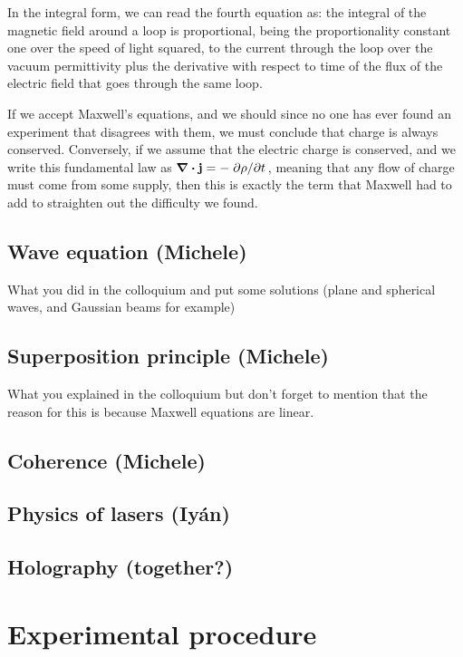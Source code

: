 \documentclass[11pt,a4paper]{article}
\begin{document}
In the integral form, we can read the fourth equation as: the integral of the magnetic field around a loop is proportional, being the proportionality constant one over the speed of light squared, to the current through the loop over the vacuum permittivity plus the derivative with respect to time of the flux of the electric field that goes through the same loop.

If we accept Maxwell's equations, and we should since no one has ever found an experiment that disagrees with them, we must conclude that charge is always conserved. Conversely, if we assume that the electric charge is conserved, and we write this fundamental law as $\div\vb{j}=-\pdv*{\rho}{t}$, meaning that any flow of charge must come from some supply, then this is exactly the term that Maxwell had to add to straighten out the difficulty we found.

\subsection{Wave equation (Michele)}
What you did in the colloquium and put some solutions (plane and spherical waves, and Gaussian beams for example)

\subsection{Superposition principle (Michele)}
What you explained in the colloquium but don't forget to mention that the reason for this is because Maxwell equations are linear.

\subsection{Coherence (Michele)}

\subsection{Physics of lasers (Iyán)}

\subsection{Holography (together?)}

\section{Experimental procedure}
\end{document}
